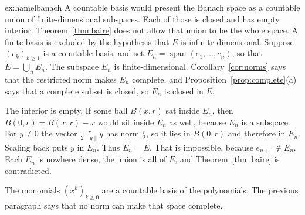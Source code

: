 \begin{solution}{ex:hamelbanach}
\idea A countable basis would present the Banach space as a countable union of finite-dimensional subspaces. Each of those is closed and has empty interior. Theorem~\ref{thm:baire} does not allow that union to be the whole space.
\writeup A finite basis is excluded by the hypothesis that $E$ is infinite-dimensional. Suppose $(e_k)_{k\ge1}$ is a countable basis, and set $E_n=\operatorname{span}(e_1,\dots,e_n)$, so that $E=\bigcup_n E_n$. The subspace $E_n$ is finite-dimensional. Corollary~\ref{cor:norms} says that the restricted norm makes $E_n$ complete, and Proposition~\ref{prop:complete}(a) says that a complete subset is closed, so $E_n$ is closed in $E$.

The interior is empty. If some ball $B(x,r)$ sat inside $E_n$, then $B(0,r)=B(x,r)-x$ would sit inside $E_n$ as well, because $E_n$ is a subspace. For $y\ne0$ the vector $\frac{r}{2\|y\|}y$ has norm $\frac r2$, so it lies in $B(0,r)$ and therefore in $E_n$. Scaling back puts $y$ in $E_n$. Thus $E_n=E$. That is impossible, because $e_{n+1}\notin E_n$. Each $E_n$ is nowhere dense, the union is all of $E$, and Theorem~\ref{thm:baire} is contradicted.

The monomials $(x^k)_{k\ge0}$ are a countable basis of the polynomials. The previous paragraph says that no norm can make that space complete.
\end{solution}

